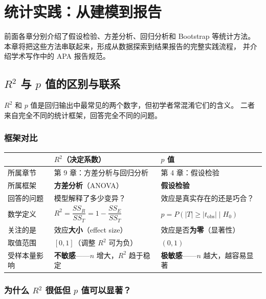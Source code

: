 \chapter{统计实践：从建模到报告}

前面各章分别介绍了假设检验、方差分析、回归分析和 Bootstrap 等统计方法。
本章将把这些方法串联起来，形成从数据探索到结果报告的完整实践流程，
并介绍学术写作中的 APA 报告规范。

\section{$R^2$ 与 $p$ 值的区别与联系}

$R^2$ 和 $p$ 值是回归输出中最常见的两个数字，但初学者常混淆它们的含义。
二者来自完全不同的统计框架，回答完全不同的问题。

\subsection{框架对比}

\begin{center}
\renewcommand{\arraystretch}{1.5}
\begin{tabular}{p{2.5cm}|p{4.5cm}|p{4.5cm}}
\toprule
& \textbf{$R^2$（决定系数）} & \textbf{$p$ 值} \\
\midrule
所属章节 & 第 9 章：方差分析与回归分析 & 第 4 章：假设检验 \\
\midrule
所属框架 & \textbf{方差分析}（ANOVA） & \textbf{假设检验} \\
\midrule
回答的问题 & 模型解释了多少变异？ & 效应是真实存在的还是巧合？ \\
\midrule
数学定义 & $R^2 = \dfrac{SS_R}{SS_T} = 1 - \dfrac{SS_E}{SS_T}$ & $p = P(|T| \ge |t_{\text{obs}}| \mid H_0)$ \\
\midrule
关注的是 & 效应\textbf{大小}（effect size） & 效应是否\textbf{为零}（显著性） \\
\midrule
取值范围 & $[0, 1]$（调整 $R^2$ 可为负） & $(0, 1)$ \\
\midrule
受样本量影响 & \textbf{不敏感}——$n$ 增大，$R^2$ 趋于稳定 & \textbf{极敏感}——$n$ 越大，越容易显著 \\
\bottomrule
\end{tabular}
\end{center}

\subsection{为什么 $R^2$ 很低但 $p$ 值可以显著？}


